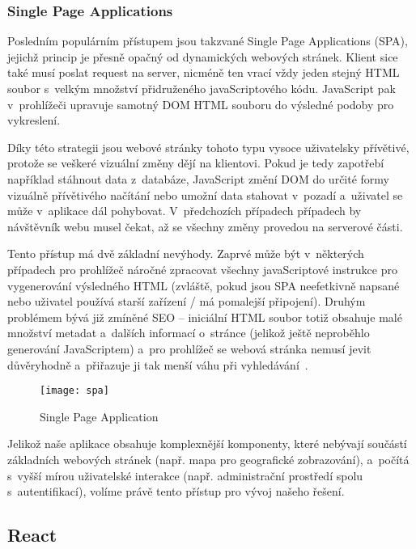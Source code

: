 \hypertarget{single-page-applications}{%
\subsubsection{Single Page Applications}\label{single-page-applications}}

Posledním populárním přístupem jsou takzvané Single Page Applications (SPA), jejichž princip je přesně opačný od dynamických webových stránek. Klient sice také musí poslat request na server, nicméně ten vrací vždy jeden stejný HTML soubor s~velkým množství přidruženého javaScriptového kódu. JavaScript pak v~prohlížeči upravuje samotný DOM HTML souboru do výsledné podoby pro vykreslení.

Díky této strategii jsou webové stránky tohoto typu vysoce uživatelsky přívětivé, protože se veškeré vizuální změny dějí na klientovi. Pokud je tedy zapotřebí například stáhnout data z~databáze, JavaScript změní DOM do určité formy vizuálně přívětivého načítání nebo umožní data stahovat v~pozadí a~uživatel se může v~aplikace dál pohybovat. V~předchozích případech případech by návštěvník webu musel čekat, až se všechny změny provedou na serverové části.

Tento přístup má dvě základní nevýhody. Zaprvé může být v~některých případech pro prohlížeč náročné zpracovat všechny javaScriptové instrukce pro vygenerování výsledného HTML (zvláště, pokud jsou SPA neefetkivně napsané nebo uživatel používá starší zařízení / má pomalejší připojení). Druhým problémem bývá již zmíněné SEO -- iniciální HTML soubor totiž obsahuje malé množství metadat a~dalších informací o~stránce (jelikož ještě neproběhlo generování JavaScriptem) a~pro prohlížeč se webová stránka nemusí jevit důvěryhodně a~přiřazuje ji tak menší váhu při vyhledávání~\parencite{spa}.

\begin{figure}[ht]   
    \centering
    \texttt{[image: spa]}  
    \caption{Single Page Application}
    \label{spa}
 \end{figure}

Jelikož naše aplikace obsahuje komplexnější komponenty, které nebývají součástí základních webových stránek (např. mapa pro geografické zobrazování), a~počítá s~vyšší mírou uživatelské interakce (např. administrační prostředí spolu s~autentifikací), volíme právě tento přístup pro vývoj našeho řešení.

\hypertarget{react}{%
\subsection{React}\label{react}}

